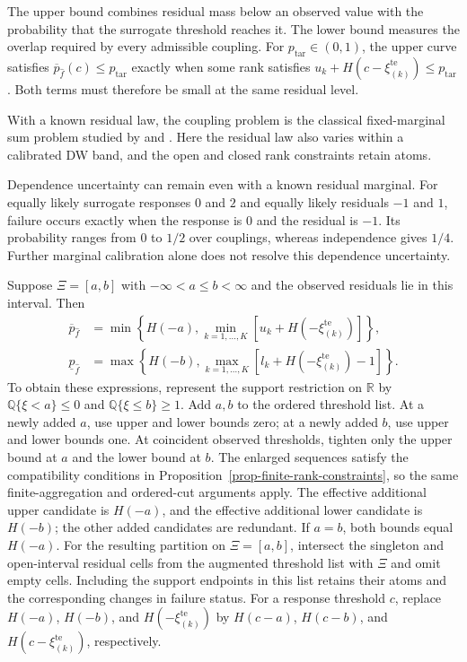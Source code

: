 \documentclass[review,11pt,3p,authoryear,nopreprintline]{elsarticle}
\begin{document}
The upper bound combines residual mass below an observed value with the probability that the surrogate threshold reaches it. The lower bound measures the overlap required by every admissible coupling. For $p_{\mathrm{tar}}\in(0,1)$, the upper curve satisfies $\overline p_{\hat f}(c)\le p_{\mathrm{tar}}$ exactly when some rank satisfies $u_k+H\left(c-\xi_{(k)}^{\mathrm{te}}\right)\le p_{\mathrm{tar}}$. Both terms must therefore be small at the same residual level.

With a known residual law, the coupling problem is the classical fixed-marginal sum problem studied by \citet{M82} and \citet{F.N.S87}. Here the residual law also varies within a calibrated DW band, and the open and closed rank constraints retain atoms.

Dependence uncertainty can remain even with a known residual marginal. For equally likely surrogate responses $0$ and $2$ and equally likely residuals $-1$ and $1$, failure occurs exactly when the response is $0$ and the residual is $-1$. Its probability ranges from $0$ to $1/2$ over couplings, whereas independence gives $1/4$. Further marginal calibration alone does not resolve this dependence uncertainty.

\begin{remark}
  \label{rem-interval-support}
  Suppose $\Xi=[a,b]$ with $-\infty<a\le b<\infty$ and the observed residuals lie in this interval. Then
  \begin{align*}
    \overline p_{\hat f}
    &=\min\left\{H(-a),\min_{k=1,\ldots,K}[u_k+H\left(-\xi_{(k)}^{\mathrm{te}}\right)]\right\},\\
    \underline p_{\hat f}
    &=\max\left\{H(-b),\max_{k=1,\ldots,K}[l_k+H\left(-\xi_{(k)}^{\mathrm{te}}\right)-1]\right\}.
  \end{align*}
  To obtain these expressions, represent the support restriction on $\mathbb R$ by
  $\mathbb Q\{\xi<a\}\le0$ and $\mathbb Q\{\xi\le b\}\ge1$.
  Add $a,b$ to the ordered threshold list. At a newly added $a$, use upper and lower bounds zero; at a newly added $b$, use upper and lower bounds one. At coincident observed thresholds, tighten only the upper bound at $a$ and the lower bound at $b$. The enlarged sequences satisfy the compatibility conditions in Proposition~\ref{prop-finite-rank-constraints}, so the same finite-aggregation and ordered-cut arguments apply. The effective additional upper candidate is $H(-a)$, and the effective additional lower candidate is $H(-b)$; the other added candidates are redundant. If $a=b$, both bounds equal $H(-a)$. For the resulting partition on $\Xi=[a,b]$, intersect the singleton and open-interval residual cells from the augmented threshold list with $\Xi$ and omit empty cells. Including the support endpoints in this list retains their atoms and the corresponding changes in failure status. For a response threshold $c$, replace $H(-a)$, $H(-b)$, and $H\left(-\xi_{(k)}^{\mathrm{te}}\right)$ by $H(c-a)$, $H(c-b)$, and $H\left(c-\xi_{(k)}^{\mathrm{te}}\right)$, respectively.
\end{remark}
\end{document}
